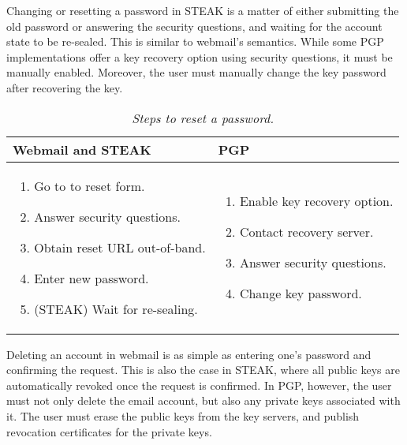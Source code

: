 Changing or resetting a password in STEAK is a matter of either submitting the old password or answering the security questions, and waiting for the account state to be re-sealed.  This is similar to webmail’s semantics.  While some PGP implementations offer a key recovery option using security questions, it must be manually enabled.  Moreover, the user must manually change the key password after recovering the key.


\begin{table}[ht!]
\begin{tabular}{ | L{3.5cm} | L{3.5cm} |}
\hline
\textbf{Webmail and STEAK} & \textbf{PGP} \\
\hline
\vspace{-3mm}
\begin{enumerate}
  \item{Go to to reset form.}
  \item{Answer security questions.} 
  \item{Obtain reset URL out-of-band.}
  \item{Enter new password.}
  \item{(STEAK) Wait for re-sealing.}
\end{enumerate} 
\vspace{-\topsep} &

\vspace{-3mm}
\begin{enumerate}
  \item{Enable key recovery option.}
  \item{Contact recovery server.}
  \item{Answer security questions.}
  \item{Change key password.}
\end{enumerate} 
\vspace{-\topsep} \\

\hline
\end{tabular}
\caption{\it Steps to reset a password.}
\label{tab:account-creation}
\end{table}

Deleting an account in webmail is as simple as entering one’s password and confirming the request.  This is also the case in STEAK, where all public keys are automatically revoked once the request is confirmed.  In PGP, however, the user must not only delete the email account, but also any private keys associated with it.  The user must erase the public keys from the key servers, and publish revocation certificates for the private keys.

